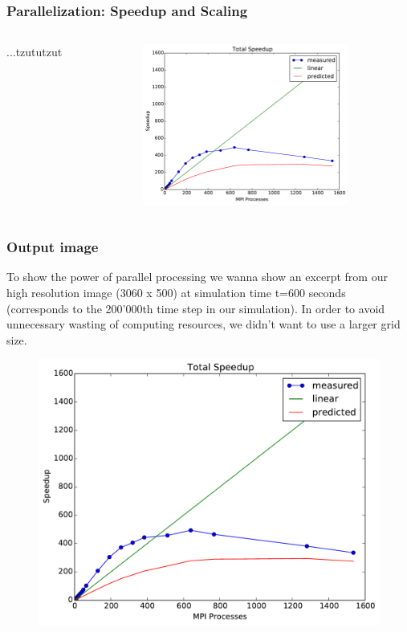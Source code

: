 \documentclass{beamer}
\begin{document}
\begin{frame}
\frametitle{Parallelization: Speedup and Scaling}
\begin{minipage}[1\textheight]{\textwidth}
\begin{columns}[T]
\begin{column}{0.5\textwidth}
\vspace{5mm}
\justify
...tzututzut
\end{column}
\begin{column}{0.5\textwidth}
\begin{figure}
\includegraphics[width=6.75cm]{speedup.pdf}
\caption{}
\end{figure}
\end{column}
\end{columns}
\end{minipage}
\end{frame}
%
%
%
\begin{frame}
\frametitle{Output image}
\justify
To show the power of parallel processing we wanna show an excerpt from our high resolution image (3060 x 500) at simulation time t=600 seconds (corresponds to the 200'000th time step in our simulation). In order to avoid unnecessary wasting of computing resources, we didn't want to use a larger grid size. 
\begin{figure}
\includegraphics[width=12cm]{speedup.pdf}
\end{figure}
\end{frame}
%
%
%
\end{document}
